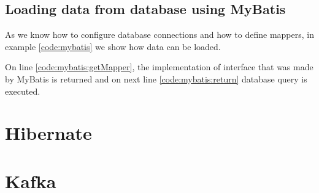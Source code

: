 \subsection{Loading data from database using MyBatis \label{mybatis:run}}

As we know how to configure database connections and how to define mappers,
in example \ref{code:mybatis} we show how data can be loaded.

On line \ref{code:mybatis:getMapper}, the implementation of  interface
that was made by MyBatis is returned and on next line \ref{code:mybatis:return} database query is executed.







\section{Hibernate}



\section{Kafka}

